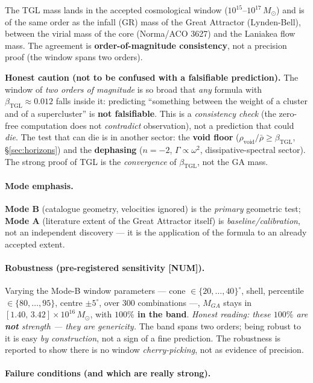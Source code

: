 \documentclass[11pt]{article}
\newcommand{\bTGL}{\beta_{\mathrm{TGL}}}\newcommand{\Msun}{M_{\odot}}\newcommand{\TGL}{\mathrm{TGL}}
\theoremstyle{definition}\newtheorem{deriv}{Derivation}
\begin{document}
The TGL mass lands in the accepted cosmological window ($10^{15}$--$10^{17}\,\Msun$) and is of the same order as the infall (GR) mass of the Great Attractor (Lynden-Bell), between the virial mass of the core (Norma/ACO 3627) and the Laniakea flow mass. The agreement is \textbf{order-of-magnitude consistency}, not a precision proof (the window spans two orders).

\textbf{Honest caution (not to be confused with a falsifiable prediction).} The window of \emph{two orders of magnitude} is so broad that \emph{any} formula with $\bTGL\approx0.012$ falls inside it: predicting ``something between the weight of a cluster and of a supercluster'' is \textbf{not falsifiable}. This is a \emph{consistency check} (the zero-free computation does not \emph{contradict} observation), not a prediction that could \emph{die}. The test that can die is in another sector: the \textbf{void floor} ($\rho_{\mathrm{void}}/\bar\rho\geq\bTGL$, \S\ref{sec:horizons}) and the \textbf{dephasing} ($n=-2$, $\Gamma\propto\omega^2$, dissipative-spectral sector). The strong proof of TGL is the \emph{convergence} of $\bTGL$, not the GA mass.

\paragraph{Mode emphasis.} \textbf{Mode B} (catalogue geometry, velocities ignored) is the \emph{primary} geometric test; \textbf{Mode A} (literature extent of the Great Attractor itself) is \emph{baseline/calibration}, not an independent discovery --- it is the application of the formula to an already accepted extent.

\paragraph{Robustness (pre-registered sensitivity \textsf{[NUM]}).} Varying the Mode-B window parameters --- cone $\in\{20,\dots,40\}^\circ$, shell, percentile $\in\{80,\dots,95\}$, centre $\pm5^\circ$, over $300$ combinations ---, $M_{GA}$ stays in $[1.40,\,3.42]\times10^{16}\,\Msun$, with \textbf{$100\%$ in the band}. \emph{Honest reading: these $100\%$ are \textbf{not} strength --- they are genericity.} The band spans two orders; being robust to it is easy \emph{by construction}, not a sign of a fine prediction. The robustness is reported to show there is no window \emph{cherry-picking}, not as evidence of precision.

\paragraph{Failure conditions (and which are really strong).}
\end{document}
